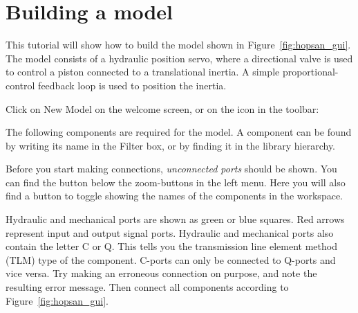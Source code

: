 \documentclass[a4paper,pdftex]{article}
\begin{document}
\section*{Building a model}
This tutorial will show how to build the model shown in Figure~\ref{fig:hopsan_gui}.
The model consists of a hydraulic position servo, where a directional valve is used to control a piston connected to a translational inertia.
A simple proportional-control feedback loop is used to position the inertia.
\begin{tutenumerate}
Click on New Model on the welcome screen, or on the icon in the toolbar:
 	
 	
The following components are required for the model.
A component can be found by writing its name in the Filter box, or by finding it in the library hierarchy.

\vspace{5pt}
\vspace{5pt}

Before you start making connections, \emph{unconnected ports} should be shown. 
You can find the button below the zoom-buttons in the left menu. 
Here you will also find a button to toggle showing the names of the components in the workspace.


Hydraulic and mechanical ports are shown as green or blue squares.
Red arrows represent input and output signal ports.
Hydraulic and mechanical ports also contain the letter C or Q.
This tells you the transmission line element method (TLM) type of the component.
C-ports can only be connected to Q-ports and vice versa.
Try making an erroneous connection on purpose, and note the resulting error message.
Then connect all components according to Figure~\ref{fig:hopsan_gui}.


\end{tutenumerate}
\end{document}
